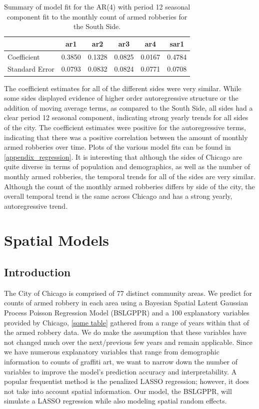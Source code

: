 \documentclass{article} %
\begin{document}
\begin{table}[t]
	\label{tab:data}
	\begin{center}
	\begin{tabular}{lccccc}
			\hline
			  & ar1 &    ar2 &    ar3 &    ar4 &   sar1 \\ \hline
			Coefficient & 0.3850 & 0.1328 & 0.0825  & 0.0167 & 0.4784  \\
			Standard Error &   0.0793 & 0.0832&  0.0824 & 0.0771  &0.0708   \\
		\end{tabular}
	\caption{Summary of model fit for the AR(4) with period 12 seasonal component fit to the monthly count of armed robberies for the South Side.}
	\end{center}
\end{table}

\noindent The coefficient estimates for all of the different sides were very similar.  While some sides displayed evidence of higher order autoregressive structure or the addition of moving average terms, as compared to the South Side, all sides had a clear period 12 seasonal component, indicating strong yearly trends for all sides of the city.  The coefficient estimates were positive for the autoregressive terms, indicating that there was a positive correlation between the amount of monthly armed robberies over time.  Plots of the various model fits can be found in \autoref{appendix_regression}.  It is interesting that although the sides of Chicago are quite diverse in terms of population and demographics, as well as the number of monthly armed robberies, the temporal trends for all of the sides are very similar.  Although the count of the monthly armed robberies differs by side of the city, the overall temporal trend is the same across Chicago and has a strong yearly, autoregressive trend.\newline   

\section{Spatial Models}


\subsection{Introduction}

The City of Chicago is comprised of 77 distinct community areas. We predict for counts of armed robbery in each area using a Bayesian Spatial Latent Gaussian Process Poisson Regression Model (BSLGPPR) and a 100 explanatory variables provided by Chicago, \autoref{some table} gathered from a range of years within that of the armed robbery data. We do make the assumption that these variables have not changed much over the next/previous few years and remain applicable. Since we have numerous explanatory variables that range from demographic information to counts of graffiti art, we want to narrow down the number of variables to improve the model's prediction accuracy and interpretability.  A popular frequentist method is the penalized LASSO regression; however, it does not take into account spatial information. Our model, the BSLGPPR, will simulate a LASSO regression while also modeling spatial random effects. 
\end{document}
